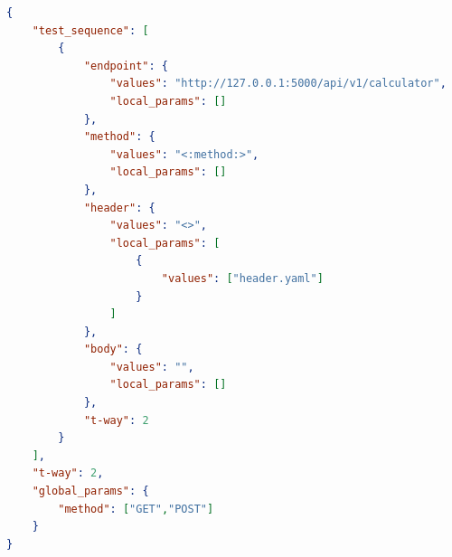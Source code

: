 
\begin{lstlisting}[language={json}]
{
	"test_sequence": [
		{
			"endpoint": {
		    	"values": "http://127.0.0.1:5000/api/v1/calculator",
			    "local_params": []
		    },
		    "method": {
				"values": "<:method:>",
				"local_params": []
			},
			"header": {
				"values": "<>",
				"local_params": [
					{
						"values": ["header.yaml"]
					}
				]
			},
			"body": {
				"values": "",
				"local_params": []
			},
			"t-way": 2
		}
	],
	"t-way": 2,
	"global_params": {
		"method": ["GET","POST"]
	}
}
\end{lstlisting}




